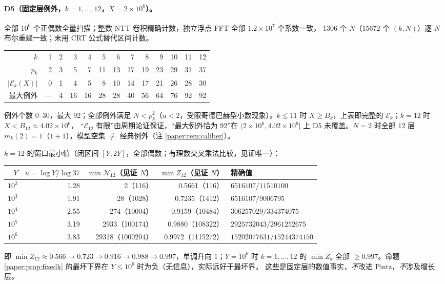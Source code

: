 \documentclass[11pt,a4paper]{article}
\newcommand{\Cnt}{\mathcal N}          %
\newcommand{\Exc}{\mathcal E}          %
\theoremstyle{plain}
\theoremstyle{definition}
\begin{document}
\begin{CJK}{UTF8}{gbsn}
\paragraph{D5（固定层例外，$k=1,\dots,12$，$X=2\times10^6$）。} 全部 $10^6$ 个正偶数全量扫描；整数 NTT 卷积精确计数，独立浮点 FFT 全部 $1.2\times10^7$ 个系数一致，
$1306$ 个 $N$（$15672$ 个 $(k,N)$）逐 $N$ 布尔重建一致；未用 CRT 公式替代区间计数。
\begin{center}
\small
\begin{tabular}{rrrrrrrrrrrrr}
\hline
$k$ & 1 & 2 & 3 & 4 & 5 & 6 & 7 & 8 & 9 & 10 & 11 & 12\\
$p_k$ & 2 & 3 & 5 & 7 & 11 & 13 & 17 & 19 & 23 & 29 & 31 & 37\\
\hline
$|\Exc_k(X)|$ & 0 & 1 & 4 & 5 & 8 & 10 & 14 & 17 & 21 & 26 & 28 & 30\\
最大例外 & — & 4 & 16 & 16 & 28 & 28 & 40 & 56 & 64 & 76 & 92 & 92\\
\hline
\end{tabular}
\end{center}
例外个数 $0$--$30$，最大 $92$；全部例外满足 $N<p_k^2$（$u<2$，受限哥德巴赫型小数现象）。$k\le11$ 时 $X\ge B_k$，上表即完整的 $\Exc_k$；$k=12$ 时 $X<B_{12}\approx4.02\times10^6$，
“$\Exc_{12}$ 有限”由周期论证保证，“最大例外恰为 $92$”在 $(2\times10^6,4.02\times10^6]$ 上 D5 未覆盖。$N=2$ 时全部 $12$ 层 $m_k(2)=1$（$1+1$），模型空集 $\ne$ 经典例外（注 \ref{paper:rem:caliber}）。

$k=12$ 的窗口最小值（闭区间 $[Y,2Y]$，全部偶数；有理数交叉乘法比较，见证唯一）：
\begin{center}
\small
\begin{tabular}{rrrrl}
\hline
$Y$ & $u=\log Y/\log37$ & $\min\Cnt_{12}$（见证 $N$） & $\min Z_{12}$（见证 $N$） & 精确值\\
\hline
$10^2$ & 1.28 & 2（116） & 0.5661（116） & $6516107/11510100$\\
$10^3$ & 1.91 & 28（1028） & 0.7235（1412） & $6516107/9006795$\\
$10^4$ & 2.55 & 274（10004） & 0.9159（10484） & $306257029/334374075$\\
$10^5$ & 3.19 & 2933（100174） & 0.9880（108322） & $2925732043/2961252675$\\
$10^6$ & 3.83 & 29318（1000204） & 0.9972（1115272） & $15202077631/15244374150$\\
\hline
\end{tabular}
\end{center}
即 $\min Z_{12}\approx0.566\to0.723\to0.916\to0.988\to0.997$，单调升向 $1$；$Y=10^6$ 时 $k=1,\dots,12$ 的 $\min Z_k$ 全部 $\ge0.997$。命题 \ref{paper:prop:fixedk} 的最坏下界在 $Y\le10^6$ 时为负（无信息），实际远好于最坏界。
这些是固定层的数值事实，\emph{不}改进 Pintz，\emph{不}涉及增长层。


\end{CJK}
\end{document}

